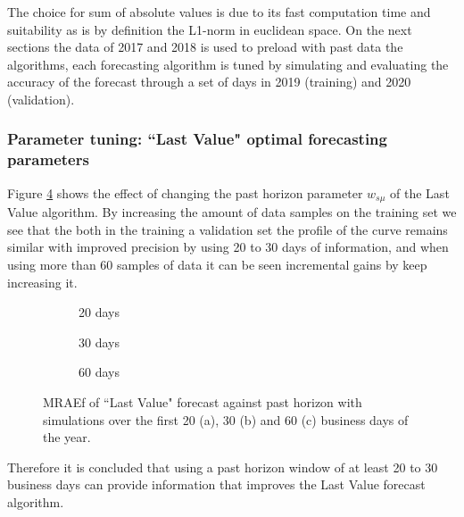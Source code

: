 The choice for sum of absolute values is due to its fast computation time and suitability as is by definition the L1-norm in euclidean space. On the next sections the data of 2017 and 2018 is used to preload with past data the algorithms, each forecasting algorithm is tuned by simulating and evaluating the accuracy of the forecast through a set of days in 2019 (training) and 2020  (validation). 

\subsubsection{Parameter tuning: ``Last Value" optimal forecasting parameters}
Figure \ref{fig:ch5_LV_forecast_optimization} shows the effect of changing the past horizon parameter $w_{s\mu}$ of the Last Value algorithm. By increasing the amount of data samples on the training set we see that the both in the training a validation set the profile of the curve remains similar with improved precision by using 20 to 30 days of information, and when using more than 60 samples of data it can be seen incremental gains by keep increasing it. 

\begin{figure}[ht!]
    \centering
    \begin{subfigure}[b]{.7\linewidth}
        
        \caption{20 days}\label{fig:mouse}
    \end{subfigure}
    
    \begin{subfigure}[b]{.495\linewidth}
         
        \caption{30 days}\label{fig:gull}
    \end{subfigure}
    \begin{subfigure}[b]{.495\linewidth}
         
        \caption{60 days}\label{fig:tiger}
    \end{subfigure}
    
    \caption{MRAEf of ``Last Value" forecast against past horizon with simulations over the first 20 (a), 30 (b) and 60 (c) business days of the year.}
    \label{fig:ch5_LV_forecast_optimization}
\end{figure}


Therefore it is concluded that using a past horizon window of at least 20 to 30 business days can provide information that improves the Last Value forecast algorithm.


